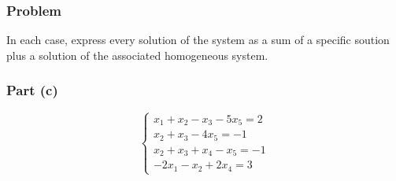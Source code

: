 \documentclass[12pt]{article}
\begin{document}
\subsubsection*{Problem}
In each case, express every solution of the system as a sum of a specific soution plus a solution of the associated homogeneous system. 
\vspace{0.25in}
\subsubsection*{Part (c)}
\begin{equation*}
  \begin{cases}
    x_1 + x_2 - x_3 - 5x_5 = 2\\ 
    x_2 + x_3 - 4x_5 = -1\\ 
    x_2 + x_3 + x_4 - x_5 = -1\\ 
    -2x_1 - x_2 + 2x_4 = 3 
  \end{cases}
\end{equation*}
\vspace{0.25in}
\end{document}
